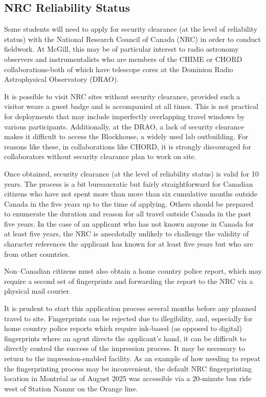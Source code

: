     \subsection{NRC Reliability Status}
        Some students will need to apply for security clearance (at the level of reliability status) with the National Research Council of Canada (NRC) in order to conduct fieldwork. At McGill, this may be of particular interest to radio astronomy observers and instrumentalists who are members of the CHIME or CHORD collaborations-both of which have telescope cores at the Dominion Radio Astrophysical Observatory (DRAO).

        It is possible to visit NRC sites without security clearance, provided such a visitor wears a guest badge and is accompanied at all times. This is not practical for deployments that may include imperfectly overlapping travel windows by various participants. Additionally, at the DRAO, a lack of security clearance makes it difficult to access the Blockhouse, a widely used lab outbuilding. For reasons like these, in collaborations like CHORD, it is strongly discouraged for collaborators without security clearance plan to work on site. 

        Once obtained, security clearance (at the level of reliability status) is valid for 10 years. The process is a bit bureaucratic but fairly straightforward for Canadian citizens who have not spent more than more than six cumulative months outside Canada in the five years up to the time of applying. Others should be prepared to enumerate the duration and reason for all travel outside Canada in the past five years. In the case of an applicant who has not known anyone in Canada for at least five years, the NRC is anecdotally unlikely to challenge the validity of character references the applicant has known for at least five years but who are from other countries.
        
        Non--Canadian citizens must also obtain a home country police report, which may require a second set of fingerprints and forwarding the report to the NRC via a physical mail courier. 

        It is prudent to start this application process several months before any planned travel to site. Fingerprints can be rejected due to illegibility, and, especially for home country police reports which require ink-based (as opposed to digital) fingerprints where an agent directs the applicant's hand, it can be difficult to directly control the success of the impression process. It may be necessary to return to the impression-enabled facility. As an example of how needing to repeat the fingerprinting process may be inconvenient, the default NRC fingerprinting location in Montr\'eal as of August 2025 was accessible via a 20-minute bus ride west of Station Namur on the Orange line. 


